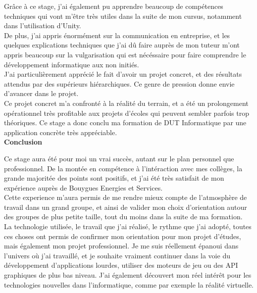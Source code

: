 \documentclass[a4paper]{article}
\begin{document}
    Grâce à ce stage, j'ai également pu apprendre beaucoup de compétences techniques qui vont m'être très utiles dans la suite de mon cursus, notamment dans l'utilisation d'Unity. \\ 

    De plus, j'ai appris énormément sur la communication en entreprise, et les quelques explications techniques que j'ai dû faire auprès de mon tuteur m'ont appris beaucoup sur la vulgarisation qui est nécéssaire pour faire comprendre le développement informatique aux non initiés. \\ 

    J'ai particulièrement apprécié le fait d'avoir un projet concret, et des résultats attendus par des supérieurs hiérarchiques. Ce genre de pression donne envie d'avancer dans le projet. \\
    
    Ce projet concret m'a confronté à la réalité du terrain, et a été un prolongement opérationnel très profitable aux projets d'écoles qui peuvent sembler parfois trop théoriques. Ce stage a donc conclu ma formation de DUT Informatique par une application concrète très appréciable. \\

    \huge \textbf{Conclusion} \vspace{5pt} \\
   \normalsize
   
    Ce stage aura été pour moi un vrai succès, autant sur le plan personnel que professionnel. De la montée en compétence à l'intéraction avec mes collèges, la grande majoritée des points sont positifs, et j'ai été très satisfait de mon expérience auprès de Bouygues Energies et Services. \\

    Cette experience m'aura permis de me rendre mieux compte de l'atmosphère de travail dans un grand groupe, et ainsi de valider mon choix d'orientation autour des groupes de plus petite taille, tout du moins dans la suite de ma formation. \\

    La technologie utilisée, le travail que j'ai réalisé, le rythme que j'ai adopté, toutes ces choses ont permis de confirmer mon orientation pour mon projet d'études, mais également mon projet professionnel. Je me suis réellement épanoui dans l'univers où j'ai travaillé, et je souhaite vraiment continuer dans la voie du développement d'applications lourdes, utiliser des moteurs de jeu ou des API graphiques de plus bas niveau. J'ai également découvert mon réel intérêt pour les technologies nouvelles dans l'informatique, comme par exemple la réalité virtuelle. \\
\end{document}
